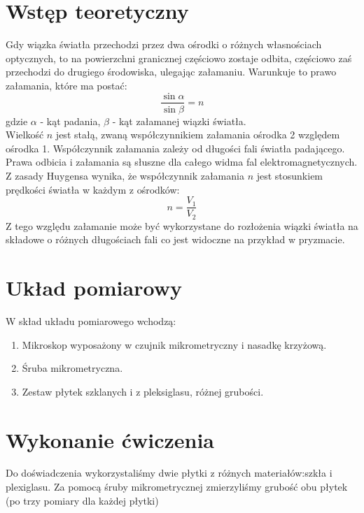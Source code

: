 \documentclass{fizraport}
\begin{document}
\maketitle
\section{Wstęp teoretyczny}
Gdy wiązka światła przechodzi przez dwa ośrodki o różnych własnościach optycznych, to na powierzchni granicznej częściowo zostaje odbita, częściowo zaś przechodzi do drugiego
środowiska, ulegając załamaniu. Warunkuje to prawo załamania, które ma postać:
\begin{equation}
\frac{\sin\alpha}{\sin\beta}=n
\end{equation}
gdzie $\alpha$ - kąt padania, $\beta$ - kąt załamanej wiązki światła.\\
Wielkość $n$ jest stałą, zwaną współczynnikiem załamania ośrodka 2 względem ośrodka 1. Współczynnik załamania zależy od długości fali światła padającego.
Prawa odbicia i załamania są słuszne dla całego widma fal elektromagnetycznych. Z zasady Huygensa wynika, że współczynnik załamania $n$ jest stosunkiem prędkości światła w każdym z ośrodków:
\begin{equation}
n=\frac{V_1}{V_2}
\end{equation}
Z tego względu załamanie może być wykorzystane do rozłożenia wiązki światła na składowe o różnych długościach fali co jest widoczne na przykład w pryzmacie.
\newpage
\section{Układ pomiarowy}
W skład układu pomiarowego wchodzą: 
\begin{enumerate}
    \item Mikroskop wyposażony w czujnik mikrometryczny i nasadkę krzyżową.
    \item Śruba mikrometryczna. 
    \item Zestaw płytek szklanych i z pleksiglasu, różnej grubości. 
\end{enumerate}



\section{Wykonanie ćwiczenia}
Do doświadczenia wykorzystaliśmy dwie płytki z różnych materiałów:szkła i plexiglasu. Za pomocą śruby mikrometrycznej zmierzyliśmy grubość obu płytek (po trzy pomiary dla każdej płytki) 
\end{document}
